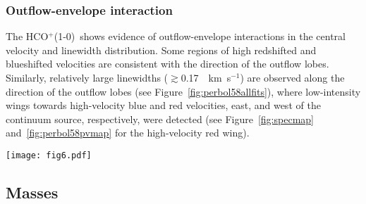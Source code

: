 \documentclass[iop]{emulateapj}
\newcommand{\kms}{\,~km~s$^{-1}$}
\newcommand{\nthp}{\mbox{\rm N$_2$H$^+$(1-0)}}
\newcommand{\hcn}{\mbox{\rm HCN(1-0)}}
\newcommand{\hcop}{\mbox{\rm  HCO$^+$(1-0)}}
\newcommand{\cs}{\mbox{\rm CS(2-1)}}
\begin{document}
\subsubsection{Outflow-envelope interaction}

The \hcop\ shows evidence of outflow-envelope interactions in the central velocity and linewidth distribution. Some regions of high redshifted and blueshifted velocities are consistent with the direction of the outflow lobes. Similarly, relatively large linewidths ($\gtrsim$0.17 \kms) are observed along the direction of the outflow lobes (see Figure~\ref{fig:perbol58allfits}), where low-intensity wings towards high-velocity blue and red velocities, east, and west of the continuum source, respectively, were detected (see Figure~\ref{fig:specmap} and~\ref{fig:perbol58pvmap} for the high-velocity red wing).


\begin{figure*}
\texttt{[image: fig6.pdf]}
\caption{Central velocity maps for the blue (column 1) and red (column 2) components using the spectral maps of \nthp, \hcn, \hcop\ and \cs. Maps of the ratio of non-thermal to thermal (at 10 K) linewidths for the blue and red components are shown in columns 3 and 4, respectively. For guidance, red and blue contours trace the integrated intensity of the red and blue components at 10$\%$ (\nthp, \hcn) and 30$\%$ (\hcop, \cs) of the maximum integrated intensity. Black contours follow the velocity from 6.9 to 8.1 \kms, in steps of 0.04 \kms for columns 1 and 2 while they follow the linewidth ratio from 1 and increasing in steps of 0.3 for columns 3 and 4. The black star marks the position of the continuum and the blue and red arrows represent the outflow as in Figure~\ref{fig:perbol58mom0}.
\label{fig:perbol58allfits}}
\end{figure*}



\subsection{Masses}
\label{sec:massesandstability}
\end{document}
